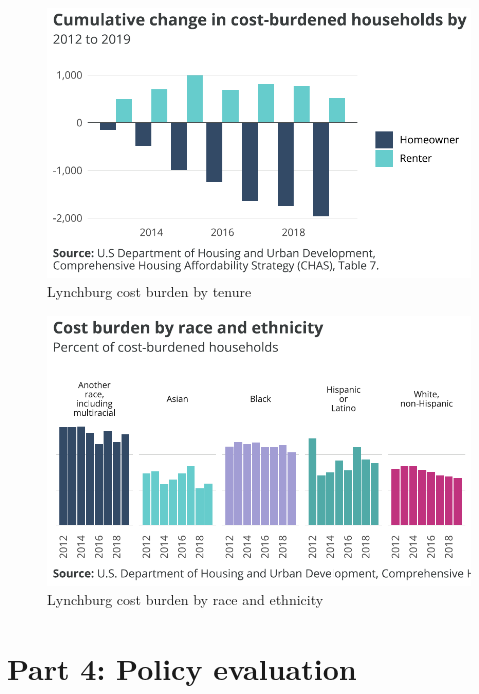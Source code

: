\documentclass[
  letterpaper,
  DIV=11,
  numbers=noendperiod]{scrreprt}
\begin{document}
\begin{figure}[H]

{\centering \includegraphics{./part-3-3_files/figure-pdf/fig-cb-tenure-1.pdf}

}

\caption{\label{fig-cb-tenure}Lynchburg cost burden by tenure}

\end{figure}

\begin{figure}[H]

{\centering \includegraphics{./part-3-3_files/figure-pdf/fig-cb-race-1.pdf}

}

\caption{\label{fig-cb-race}Lynchburg cost burden by race and ethnicity}

\end{figure}

\part{Part 4: Policy evaluation}
\end{document}
